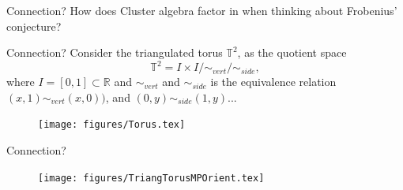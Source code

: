 \documentclass{beamer}
\begin{document}
\begin{frame}{Connection?}
    How does Cluster algebra factor in when thinking about Frobenius' conjecture?
\end{frame}
\begin{frame}{Connection?}
    Consider the triangulated torus $\mathbb{T}^2$, as the quotient space
    \begin{equation*}
        \mathbb{T}^2 = I \times I/\sim_{vert}/\sim_{side}, 
    \end{equation*}
    where $I = [0,1] \subset \mathbb{R}$ and $\sim_{vert}$ and $\sim_{side}$ is the equivalence relation $(x,1)\sim_{vert}(x,0))$, and $(0,y)\sim_{side}(1,y)$...
    \pause
    \begin{figure}
        \centering
        \texttt{[image: figures/Torus.tex]}
    \end{figure}
\end{frame}
\begin{frame}{Connection?}
\begin{figure}
    \centering\texttt{[image: figures/TriangTorusMPOrient.tex]}
\end{figure}    
\end{frame}
\end{document}
